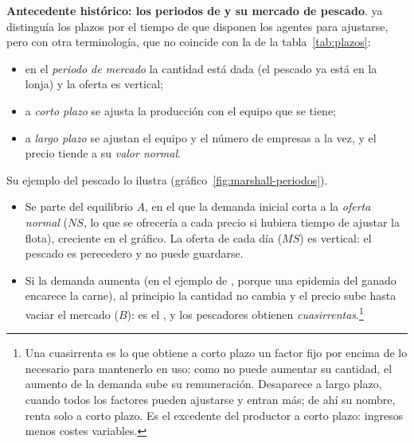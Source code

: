 \documentclass[11pt]{article}
\begin{document}
\begin{anotaciones}
\textbf{Antecedente histórico: los periodos de  y su mercado de pescado}. \textcite[libro~V, cap.~V]{Marshall1890Principles} ya distinguía los plazos por el tiempo de que disponen los agentes para ajustarse, pero con otra terminología, que no coincide con la de la tabla~\ref{tab:plazos}:
\begin{itemize}
\item en el \emph{periodo de mercado} la cantidad está dada (el pescado ya está en la lonja) y la oferta es vertical;
\item a \emph{corto plazo} se ajusta la producción con el equipo que se tiene;
\item a \emph{largo plazo} se ajustan el equipo y el número de empresas a la vez, y el precio tiende a su \emph{valor normal}.
\end{itemize}
Su ejemplo del pescado lo ilustra (gráfico~\ref{fig:marshall-periodos}).
\begin{figuracaja}
\caption{El mercado de pescado de : equilibrio temporal ($B$) y equilibrio normal ($C$) tras un aumento de la demanda}\label{fig:marshall-periodos}
\end{figuracaja}
\begin{itemize}
\item Se parte del equilibrio $A$, en el que la demanda inicial corta a la \emph{oferta normal} ($NS$, lo que se ofrecería a cada precio si hubiera tiempo de ajustar la flota), creciente en el gráfico. La oferta de cada día ($MS$) es vertical: el pescado es perecedero y no puede guardarse.
\item Si la demanda aumenta (en el ejemplo de , porque una epidemia del ganado encarece la carne), al principio la cantidad no cambia y el precio sube hasta vaciar el mercado ($B$): es el , y los pescadores obtienen \emph{cuasirrentas}.\footnote{Una cuasirrenta es lo que obtiene a corto plazo un factor fijo por encima de lo necesario para mantenerlo en uso: como no puede aumentar su cantidad, el aumento de la demanda sube su remuneración. Desaparece a largo plazo, cuando todos los factores pueden ajustarse y entran más; de ahí su nombre, renta solo a corto plazo\nocite{Marshall1890Principles}. Es el excedente del productor a corto plazo: ingresos menos costes variables.}

\end{itemize}
\end{anotaciones}
\end{document}
